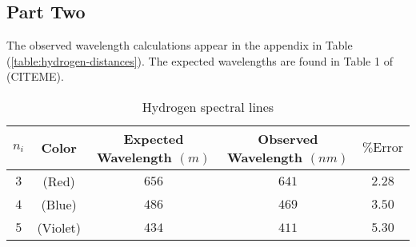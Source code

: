 \documentclass{article}
\newcommand{\pError}[0]{\ensuremath{\% \text{Error}}}
\begin{document}
\subsection{Part Two}

The observed wavelength calculations appear in the appendix in Table (\ref{table:hydrogen-distances}).
The expected wavelengths are found in Table 1 of (CITEME).
\begin{table}[h!]
  \centering
  \begin{tabular}{ |cc|c|c|c| }
    \hline
    $n_i$ & Color & Expected Wavelength $(\si{m})$ & Observed Wavelength $(\si{nm})$ & $\pError$ \\
    \hline
    $3$ & (Red)    & $656$ & $641$ & $2.28$ \\
    $4$ & (Blue)   & $486$ & $469$ & $3.50$ \\
    $5$ & (Violet) & $434$ & $411$ & $5.30$ \\
    \hline
  \end{tabular}
  \caption{
    Hydrogen spectral lines
  }
\end{table}

\begin{figure}[H]
  \centering
\end{figure}
\end{document}
